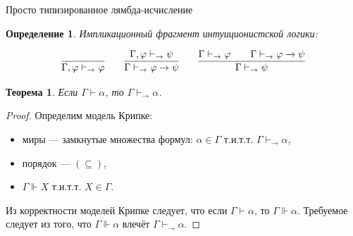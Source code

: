 \documentclass[aspectratio=169]{beamer}
\newtheorem{thm}{Теорема}[section]
\newtheorem{dfn}{Определение}[section]
\begin{document}
\begin{frame}{Просто типизированное лямбда-исчисление}
\begin{dfn}Импликационный фрагмент интуиционистской логики:

$$\infer{\Gamma,\varphi \vdash_\rightarrow \varphi}{} \quad\quad 
  \infer{\Gamma\vdash_\rightarrow\varphi\rightarrow\psi}{\Gamma,\varphi\vdash_\rightarrow\psi} \quad\quad 
  \infer{\Gamma\vdash_\rightarrow\psi}{\Gamma\vdash_\rightarrow\varphi\quad\quad\Gamma\vdash_\rightarrow\varphi\rightarrow\psi}$$
\end{dfn}

\vspace{-0.3cm}
\begin{thm}Если $\Gamma\vdash\alpha$, то $\Gamma\vdash_\rightarrow\alpha$.\end{thm}
\begin{proof}
Определим модель Крипке: \begin{itemize}
\item миры --- замкнутые множества формул: $\alpha\in\Gamma$ т.и.т.т. $\Gamma\vdash_\rightarrow\alpha$, 
\item порядок --- $(\subseteq)$,
\item $\Gamma\Vdash X$ т.и.т.т. $X\in\Gamma$.
\end{itemize}


Из корректности моделей Крипке следует, что если $\Gamma\vdash\alpha$, то $\Gamma\Vdash \alpha$.
Требуемое следует из того, что $\Gamma\Vdash \alpha$ влечёт $\Gamma\vdash_\rightarrow\alpha$.
\end{proof}
\end{frame}
\end{document}
